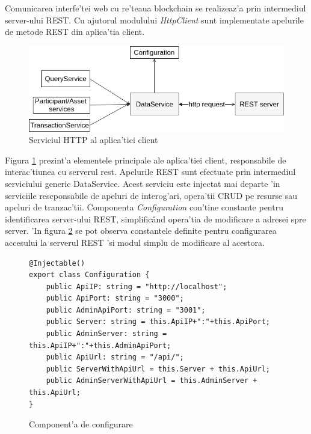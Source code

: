 \documentclass[12pt,a4paper,twoside]{report}
\begin{document}
  	Comunicarea interfe'tei web cu re'teaua blockchain se realizeaz'a prin intermediul server-ului REST. Cu ajutorul modulului \emph{HttpClient} sunt implementate apelurile de metode REST din aplica'tia client. 
  	
  	 	
  	  	 \begin{figure}[H]
		\begin{center}
			\includegraphics[scale=0.55]{img/data-rest.png}
			\caption{Serviciul HTTP al aplica'tiei client}
  			\label{fig:data}
  		\end{center}
  		\end{figure}
  		
  	Figura \ref{fig:data} prezint'a elementele principale ale aplica'tiei client, responsabile de interac'tiunea cu serverul rest. Apelurile REST sunt efectuate prin intermediul serviciului generic DataService. Acest serviciu este injectat mai departe 'in serviciile rescponsabile de apeluri de interog'ari, opera'tii CRUD pe resurse sau apeluri de tranzac'tii. Componenta \emph{Configuration} con'tine constante pentru identificarea server-ului REST, simplific\^and opera'tia de modificare a adresei spre server. 'In figura \ref{config} se pot observa constantele definite pentru configurarea accesului la serverul REST 'si modul simplu de modificare al acestora.
  	\begin{figure}[H]
  	\begin{lstlisting}[style=htmlcssjs]
@Injectable()
export class Configuration {
    public ApiIP: string = "http://localhost";
    public ApiPort: string = "3000";
    public AdminApiPort: string = "3001";
    public Server: string = this.ApiIP+":"+this.ApiPort;
    public AdminServer: string = this.ApiIP+":"+this.AdminApiPort;
    public ApiUrl: string = "/api/";
    public ServerWithApiUrl = this.Server + this.ApiUrl;
    public AdminServerWithApiUrl = this.AdminServer + this.ApiUrl; 
}

  	\end{lstlisting}
  	\caption{Component'a de configurare}
  	\label{config}
  	\end{figure}
\end{document}
